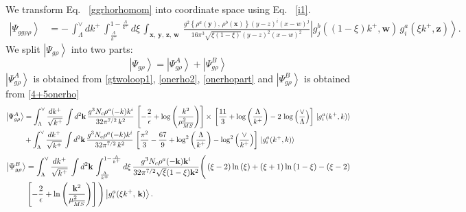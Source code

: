 \documentclass[aps,prd,amsmath,amssymb,nofootinbib]{revtex4-2}
\numberwithin{equation}{section}
\begin{document}
We transform Eq.~ \eqref{ggrhorhomom} into coordinate space using Eq.~ \eqref{i1}. 
\begin{align} \label{ggrhorhopos}
    \left|\Psi_{gg\rho\rho}\right\rangle & =  -\,\int_{\Lambda}^{\vee}dk^{+}\,\int_{\frac{\Lambda}{k^{+}}}^{1-\frac{\Lambda}{k^{+}}}d\xi\,\int_{\mathbf{x},\,\mathbf{y},\,\mathbf{z},\,\mathbf{w}}\,\frac{g^{2}\left\{ \rho^{a}(\mathbf{y}),\,\rho^{b}(\mathbf{x})\right\} (y-z)^{i}(x-w)^{j}}{16\pi^{3}\sqrt{\xi(1-\xi)}(y-z)^{2}(x-w)^{2}}\left|g_{j}^{b}((1-\xi)k^{+},\mathbf{w})\, g_{i}^{a}(\xi k^{+},\mathbf{z})\right\rangle .
\end{align}
We split $\left|\Psi_{g\rho}\right\rangle$ into two parts: 
$$\left|\Psi_{g\rho}\right\rangle = \left|\Psi^{A}_{g\rho}\right\rangle + \left|\Psi^{B}_{g\rho}\right\rangle $$
$\left|\Psi^{A}_{g\rho}\right\rangle$ is obtained from \eqref{gtwoloop1}, \eqref{onerho2}, \eqref{onerhopart} and $\left|\Psi^{B}_{g\rho}\right\rangle$ is obtained from \eqref{4+5onerho} 
\begin{align}
     \left|\Psi^{A}_{g\rho}\right\rangle & =\int_{\Lambda}^{\vee}\frac{dk^{+}}{\sqrt{k^{+}}}\,\int d^{2}\mathbf{k}\,\frac{g^{3}N_{c}\rho^{a}(-k)k^{i}}{32\pi^{7/2}\,k^{2}}\,\left[-\frac{2}{\epsilon}+\log{\left(\frac{k^{2}}{\mu^{2}_{\overline{MS}}}\right)}\right]\times\, \left[\frac{11}{3}+\log{\left(\frac{\Lambda}{k^{+}}\right)}-2\,\log{\left(\frac{\vee}{\Lambda}\right)}\right]\, \ket{g^{a}_{i}(k^{+},k)}\notag \\ & + \int_{\Lambda}^{\vee}\frac{dk^{+}}{\sqrt{k^{+}}}\,\int d^{2}\mathbf{k}\,\frac{g^{3}N_{c}\rho^{a}(-k)k^{i}}{32\pi^{7/2}\,k^{2}}\, \left[\frac{\pi^{2}}{3} - \frac{67}{9} +\log^{2}\left(\frac{\Lambda}{k^{+}}\right)-\log^{2}\left(\frac{\vee}{k^{+}}\right)\right]\, \ket{g^{a}_{i}(k^{+},k)}
\end{align}
\begin{align}
 \left|\Psi^{B}_{g\rho}\right\rangle & = \int_{\Lambda}^{\vee}\frac{dk^{+}}{\sqrt{k^{+}}}\,\int d^{2}\mathbf{k}\,\int_{\frac{\Lambda}{k^{+}}}^{1-\frac{\Lambda}{k^{+}}}d\xi\,\frac{g^{3}N_{c}\rho^{a}(-\mathbf{k})\mathbf{k}^{i}}{32\pi^{7/2}\sqrt{\xi}(1-\xi)\mathbf{k}^{2}}\Bigg(\left(\xi-2\right)\ln\left(\xi\right)+\left(\xi+1\right)\ln\left(1-\xi\right)-\left(\xi-2\right)\notag \\ & \left[-\frac{2}{\epsilon}+\ln\left(\frac{\mathbf{k}^{2}}{\mu_{\overline{MS}}^{2}}\right)\right]\Bigg)\left|g_{i}^{a}(\xi k^{+},\, \mathbf{k})\right\rangle.
\end{align}
\end{document}
